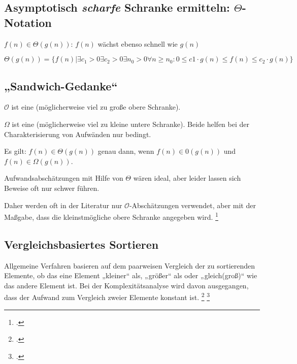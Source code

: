 \documentclass{lehramt-informatik-haupt}
\begin{document}
\subsection{Asymptotisch \emph{scharfe} Schranke ermitteln: $\Theta$-Notation}

\begin{compactitem}
\item $f(n) \in \Theta(g(n))$: $f(n)$ wächst ebenso schnell wie $g(n)$
\item $\Theta(g(n)) = \{f(n) |
\exists c_1 > 0
\exists c_2 > 0
\exists n_0 > 0
\forall n \geq n_0 :
 0 \leq c 1 \cdot g(n) \leq f(n) \leq c_2 \cdot g(n) \}$
\end{compactitem}

\subsection{„Sandwich-Gedanke“}

\begin{compactitem}
\item $\mathcal{O}$ ist eine (möglicherweise viel zu große obere
Schranke).

\item $\Omega$ ist eine (möglicherweise viel zu kleine untere
Schranke). Beide helfen bei der Charakterisierung von Aufwänden nur
bedingt.

\item  Es gilt: $f(n) \in \Theta(g(n))$ genau dann, wenn $f(n) \in
\mathcal{0}(g(n))$ und $f(n) \in \Omega(g(n))$.

\item Aufwandsabschätzungen mit Hilfe von $\Theta$ wären ideal, aber
leider lassen sich Beweise oft nur schwer führen.
\end{compactitem}

Daher werden oft in der Literatur nur $\mathcal{O}$-Abschätzungen
verwendet, aber mit der Maßgabe, dass die kleinstmögliche obere Schranke
angegeben wird.
\footcite[Seite 37 (PDF 26)]{aud:fs:2}

\subsection{Vergleichsbasiertes Sortieren}

Allgemeine Verfahren basieren auf dem paarweisen Vergleich der zu
sortierenden Elemente, ob das eine Element „kleiner“ als, „größer“ als
oder „gleich(groß)“ wie das andere Element ist. Bei der
Komplexitätsanalyse wird davon ausgegangen, dass der Aufwand zum
Vergleich zweier Elemente konstant ist.
\footcite{wiki:sortierverfahren}
\footcite[Seite 35 (PDF 24)]{aud:fs:2}
\end{document}
